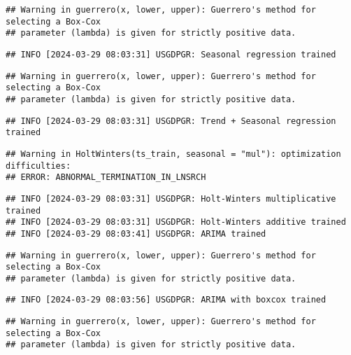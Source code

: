 \documentclass[
]{article}
\begin{document}
\begin{verbatim}
## Warning in guerrero(x, lower, upper): Guerrero's method for selecting a Box-Cox
## parameter (lambda) is given for strictly positive data.
\end{verbatim}

\begin{verbatim}
## INFO [2024-03-29 08:03:31] USGDPGR: Seasonal regression trained
\end{verbatim}

\begin{verbatim}
## Warning in guerrero(x, lower, upper): Guerrero's method for selecting a Box-Cox
## parameter (lambda) is given for strictly positive data.
\end{verbatim}

\begin{verbatim}
## INFO [2024-03-29 08:03:31] USGDPGR: Trend + Seasonal regression trained
\end{verbatim}

\begin{verbatim}
## Warning in HoltWinters(ts_train, seasonal = "mul"): optimization difficulties:
## ERROR: ABNORMAL_TERMINATION_IN_LNSRCH
\end{verbatim}

\begin{verbatim}
## INFO [2024-03-29 08:03:31] USGDPGR: Holt-Winters multiplicative trained
## INFO [2024-03-29 08:03:31] USGDPGR: Holt-Winters additive trained
## INFO [2024-03-29 08:03:41] USGDPGR: ARIMA trained
\end{verbatim}

\begin{verbatim}
## Warning in guerrero(x, lower, upper): Guerrero's method for selecting a Box-Cox
## parameter (lambda) is given for strictly positive data.
\end{verbatim}

\begin{verbatim}
## INFO [2024-03-29 08:03:56] USGDPGR: ARIMA with boxcox trained
\end{verbatim}

\begin{verbatim}
## Warning in guerrero(x, lower, upper): Guerrero's method for selecting a Box-Cox
## parameter (lambda) is given for strictly positive data.
\end{verbatim}
\end{document}
